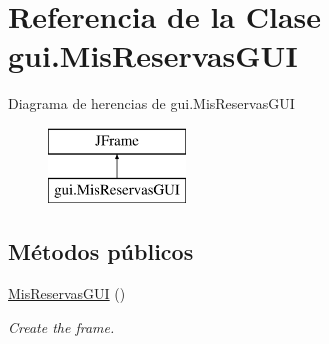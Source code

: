 \hypertarget{classgui_1_1_mis_reservas_g_u_i}{}\section{Referencia de la Clase gui.\+Mis\+Reservas\+G\+UI}
\label{classgui_1_1_mis_reservas_g_u_i}
Diagrama de herencias de gui.\+Mis\+Reservas\+G\+UI\begin{figure}[H]
\begin{center}
\leavevmode
\includegraphics[height=2.000000cm]{classgui_1_1_mis_reservas_g_u_i}
\end{center}
\end{figure}
\subsection*{Métodos públicos}
\begin{DoxyCompactItemize}
\item 
\mbox{\hyperlink{classgui_1_1_mis_reservas_g_u_i_a1ebc31bd1d49fb416e11887848fe61b3}{Mis\+Reservas\+G\+UI}} ()
\begin{DoxyCompactList}\small\item\em Create the frame. \end{DoxyCompactList}\end{DoxyCompactItemize}
